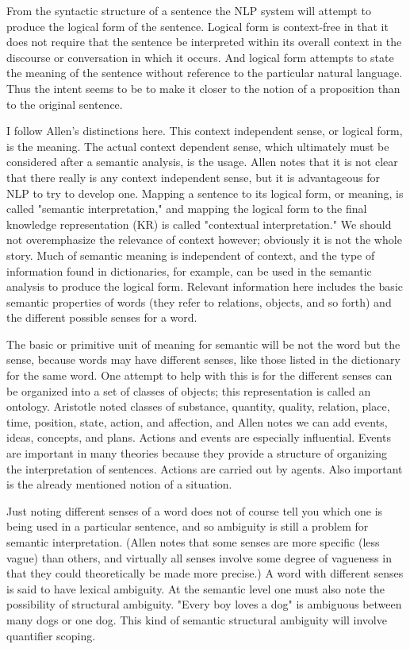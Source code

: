 From the syntactic structure of a sentence the NLP system will attempt to produce the logical form of the sentence. Logical form is context-free in that it does not require that the sentence be interpreted within its overall context in the discourse or conversation in which it occurs. And logical form attempts to state the meaning of the sentence without reference to the particular natural language. Thus the intent seems to be to make it closer to the notion of a proposition than to the original sentence.

I follow Allen's distinctions here. This context independent sense, or logical form, is the meaning. The actual context dependent sense, which ultimately must be considered after a semantic analysis, is the usage. Allen notes that it is not clear that there really is any context independent sense, but it is advantageous for NLP to try to develop one. Mapping a sentence to its logical form, or meaning, is called "semantic interpretation," and mapping the logical form to the final knowledge representation (KR) is called "contextual interpretation." We should not overemphasize the relevance of context however; obviously it is not the whole story. Much of semantic meaning is independent of context, and the type of information found in dictionaries, for example, can be used in the semantic analysis to produce the logical form. Relevant information here includes the basic semantic properties of words (they refer to relations, objects, and so forth) and the different possible senses for a word.

The basic or primitive unit of meaning for semantic will be not the word but the sense, because words may have different senses, like those listed in the dictionary for the same word. One attempt to help with this is for the different senses can be organized into a set of classes of objects; this representation is called an ontology. Aristotle noted classes of substance, quantity, quality, relation, place, time, position, state, action, and affection, and Allen notes we can add events, ideas, concepts, and plans. Actions and events are especially influential. Events are important in many theories because they provide a structure of organizing the interpretation of sentences. Actions are carried out by agents. Also important is the already mentioned notion of a situation.

Just noting different senses of a word does not of course tell you which one is being used in a particular sentence, and so ambiguity is still a problem for semantic interpretation. (Allen notes that some senses are more specific (less vague) than others, and virtually all senses involve some degree of vagueness in that they could theoretically be made more precise.) A word with different senses is said to have lexical ambiguity. At the semantic level one must also note the possibility of structural ambiguity. "Every boy loves a dog" is ambiguous between many dogs or one dog. This kind of semantic structural ambiguity will involve quantifier scoping.

